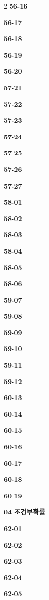 \documentclass[10pt,a4paper]{article}
\begin{document}
\begin{multicols}{2}
\noindent\textbf{56-16}\ \par
\noindent\textbf{56-17}\ \par
\noindent\textbf{56-18}\ \par
\noindent\textbf{56-19}\ \par
\noindent\textbf{56-20}\ \par
\noindent\textbf{57-21}\ \par
\noindent\textbf{57-22}\ \par
\noindent\textbf{57-23}\ \par
\noindent\textbf{57-24}\ \par
\noindent\textbf{57-25}\ \par
\noindent\textbf{57-26}\ \par
\noindent\textbf{57-27}\ \par
\noindent\textbf{58-01}\ \par
\noindent\textbf{58-02}\ \par
\noindent\textbf{58-03}\ \par
\noindent\textbf{58-04}\ \par
\noindent\textbf{58-05}\ \par
\noindent\textbf{58-06}\ \par
\noindent\textbf{59-07}\ \par
\noindent\textbf{59-08}\ \par
\noindent\textbf{59-09}\ \par
\noindent\textbf{59-10}\ \par
\noindent\textbf{59-11}\ \par
\noindent\textbf{59-12}\ \par
\noindent\textbf{60-13}\ \par
\noindent\textbf{60-14}\ \par
\noindent\textbf{60-15}\ \par
\noindent\textbf{60-16}\ \par
\noindent\textbf{60-17}\ \par
\noindent\textbf{60-18}\ \par
\noindent\textbf{60-19}\ \par
\noindent\textbf{04 조건부확률}\par\smallskip
\noindent\textbf{62-01}\ \par
\noindent\textbf{62-02}\ \par
\noindent\textbf{62-03}\ \par
\noindent\textbf{62-04}\ \par
\noindent\textbf{62-05}\ \par

\end{multicols}
\end{document}
